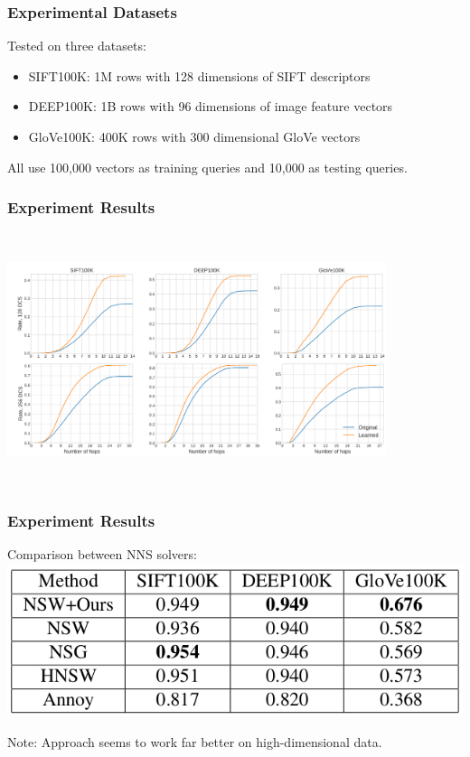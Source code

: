 \begin{frame}[t]
    \frametitle{Experimental Datasets}
    Tested on three datasets:\\
    \begin{itemize}
        \item SIFT100K: 1M rows with 128 dimensions of SIFT descriptors
        \item DEEP100K: 1B rows with 96 dimensions of image feature vectors
        \item GloVe100K: 400K rows with 300 dimensional GloVe vectors
    \end{itemize}

    All use 100,000 vectors as training queries and 10,000 as testing queries.
\end{frame}

\begin{frame}[t]
    \frametitle{Experiment Results}
    \begin{center}
        \includegraphics[width=30em, height=20em]{figures/Results1.png}
    \end{center}
\end{frame}

\begin{frame}[t]
    \frametitle{Experiment Results}
    Comparison between NNS solvers:\\
    \includegraphics[scale=0.4]{figures/Results2.png}

    Note: Approach seems to work far better on high-dimensional data.

\end{frame}


